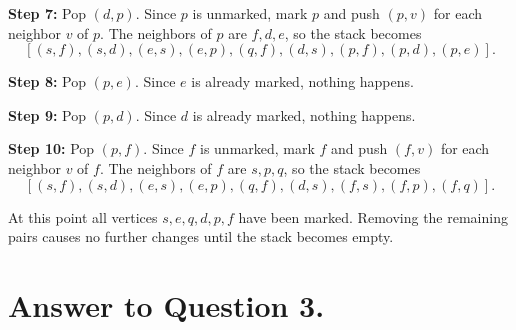 \documentclass{brockcosc3p03}
\begin{document}
\textbf{Step 7:} Pop $(d,p)$. Since $p$ is unmarked, mark $p$ and push
$(p,v)$ for each neighbor $v$ of $p$.
The neighbors of $p$ are $f,d,e$, so the stack becomes
\[
[(s,f),(s,d),(e,s),(e,p),(q,f),(d,s),(p,f),(p,d),(p,e)].
\]

\textbf{Step 8:} Pop $(p,e)$. Since $e$ is already marked, nothing happens.

\textbf{Step 9:} Pop $(p,d)$. Since $d$ is already marked, nothing happens.

\textbf{Step 10:} Pop $(p,f)$. Since $f$ is unmarked, mark $f$ and push
$(f,v)$ for each neighbor $v$ of $f$.
The neighbors of $f$ are $s,p,q$, so the stack becomes
\[
[(s,f),(s,d),(e,s),(e,p),(q,f),(d,s),(f,s),(f,p),(f,q)].
\]

At this point all vertices $s,e,q,d,p,f$ have been marked. Removing the
remaining pairs causes no further changes until the stack becomes empty.

\newpage
\section*{Answer to Question 3.}
\end{document}
